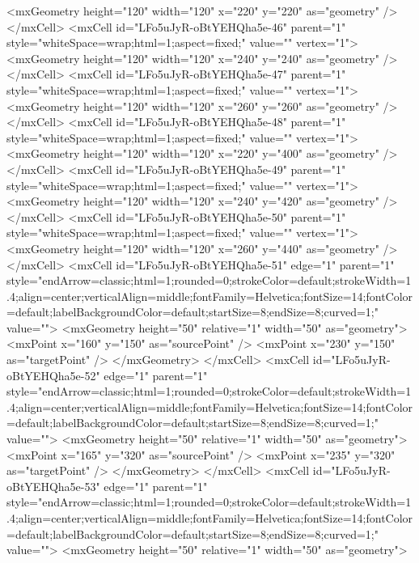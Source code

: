           <mxGeometry height="120" width="120" x="220" y="220" as="geometry" />
        </mxCell>
        <mxCell id="LFo5uJyR-oBtYEHQha5e-46" parent="1" style="whiteSpace=wrap;html=1;aspect=fixed;" value="" vertex="1">
          <mxGeometry height="120" width="120" x="240" y="240" as="geometry" />
        </mxCell>
        <mxCell id="LFo5uJyR-oBtYEHQha5e-47" parent="1" style="whiteSpace=wrap;html=1;aspect=fixed;" value="" vertex="1">
          <mxGeometry height="120" width="120" x="260" y="260" as="geometry" />
        </mxCell>
        <mxCell id="LFo5uJyR-oBtYEHQha5e-48" parent="1" style="whiteSpace=wrap;html=1;aspect=fixed;" value="" vertex="1">
          <mxGeometry height="120" width="120" x="220" y="400" as="geometry" />
        </mxCell>
        <mxCell id="LFo5uJyR-oBtYEHQha5e-49" parent="1" style="whiteSpace=wrap;html=1;aspect=fixed;" value="" vertex="1">
          <mxGeometry height="120" width="120" x="240" y="420" as="geometry" />
        </mxCell>
        <mxCell id="LFo5uJyR-oBtYEHQha5e-50" parent="1" style="whiteSpace=wrap;html=1;aspect=fixed;" value="" vertex="1">
          <mxGeometry height="120" width="120" x="260" y="440" as="geometry" />
        </mxCell>
        <mxCell id="LFo5uJyR-oBtYEHQha5e-51" edge="1" parent="1" style="endArrow=classic;html=1;rounded=0;strokeColor=default;strokeWidth=1.4;align=center;verticalAlign=middle;fontFamily=Helvetica;fontSize=14;fontColor=default;labelBackgroundColor=default;startSize=8;endSize=8;curved=1;" value="">
          <mxGeometry height="50" relative="1" width="50" as="geometry">
            <mxPoint x="160" y="150" as="sourcePoint" />
            <mxPoint x="230" y="150" as="targetPoint" />
          </mxGeometry>
        </mxCell>
        <mxCell id="LFo5uJyR-oBtYEHQha5e-52" edge="1" parent="1" style="endArrow=classic;html=1;rounded=0;strokeColor=default;strokeWidth=1.4;align=center;verticalAlign=middle;fontFamily=Helvetica;fontSize=14;fontColor=default;labelBackgroundColor=default;startSize=8;endSize=8;curved=1;" value="">
          <mxGeometry height="50" relative="1" width="50" as="geometry">
            <mxPoint x="165" y="320" as="sourcePoint" />
            <mxPoint x="235" y="320" as="targetPoint" />
          </mxGeometry>
        </mxCell>
        <mxCell id="LFo5uJyR-oBtYEHQha5e-53" edge="1" parent="1" style="endArrow=classic;html=1;rounded=0;strokeColor=default;strokeWidth=1.4;align=center;verticalAlign=middle;fontFamily=Helvetica;fontSize=14;fontColor=default;labelBackgroundColor=default;startSize=8;endSize=8;curved=1;" value="">
          <mxGeometry height="50" relative="1" width="50" as="geometry">
